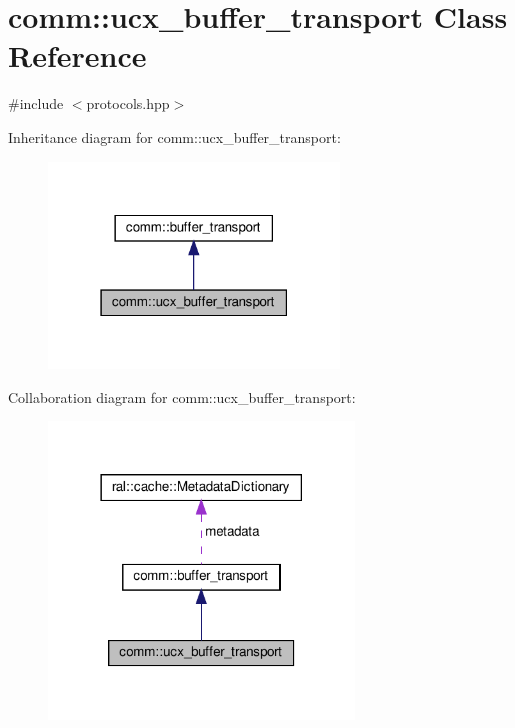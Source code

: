 \hypertarget{classcomm_1_1ucx__buffer__transport}{}\section{comm\+:\+:ucx\+\_\+buffer\+\_\+transport Class Reference}
\label{classcomm_1_1ucx__buffer__transport}


{\ttfamily \#include $<$protocols.\+hpp$>$}



Inheritance diagram for comm\+:\+:ucx\+\_\+buffer\+\_\+transport\+:\nopagebreak
\begin{figure}[H]
\begin{center}
\leavevmode
\includegraphics[width=219pt]{classcomm_1_1ucx__buffer__transport__inherit__graph}
\end{center}
\end{figure}


Collaboration diagram for comm\+:\+:ucx\+\_\+buffer\+\_\+transport\+:\nopagebreak
\begin{figure}[H]
\begin{center}
\leavevmode
\includegraphics[width=230pt]{classcomm_1_1ucx__buffer__transport__coll__graph}
\end{center}
\end{figure}
